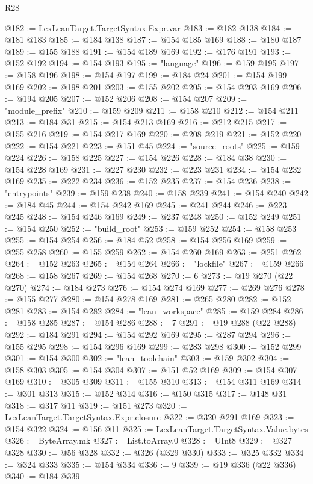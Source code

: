 \begin{lexlean}{R28}
\begin{coremodule}
@182 := LexLeanTarget.TargetSyntax.Expr.var
@183 := @182 @138
@184 := @181 @183
@185 := @184 @138
@187 := @154 @185 @169
@188 := @180 @187
@189 := @155 @188
@191 := @154 @189 @169
@192 := @176 @191
@193 := @152 @192
@194 := @154 @193
@195 := "language"
@196 := @159 @195
@197 := @158 @196
@198 := @154 @197
@199 := @184 @24
@201 := @154 @199 @169
@202 := @198 @201
@203 := @155 @202
@205 := @154 @203 @169
@206 := @194 @205
@207 := @152 @206
@208 := @154 @207
@209 := "module_prefix"
@210 := @159 @209
@211 := @158 @210
@212 := @154 @211
@213 := @184 @31
@215 := @154 @213 @169
@216 := @212 @215
@217 := @155 @216
@219 := @154 @217 @169
@220 := @208 @219
@221 := @152 @220
@222 := @154 @221
@223 := @151 @45
@224 := "source_roots"
@225 := @159 @224
@226 := @158 @225
@227 := @154 @226
@228 := @184 @38
@230 := @154 @228 @169
@231 := @227 @230
@232 := @223 @231
@234 := @154 @232 @169
@235 := @222 @234
@236 := @152 @235
@237 := @154 @236
@238 := "entrypoints"
@239 := @159 @238
@240 := @158 @239
@241 := @154 @240
@242 := @184 @45
@244 := @154 @242 @169
@245 := @241 @244
@246 := @223 @245
@248 := @154 @246 @169
@249 := @237 @248
@250 := @152 @249
@251 := @154 @250
@252 := "build_root"
@253 := @159 @252
@254 := @158 @253
@255 := @154 @254
@256 := @184 @52
@258 := @154 @256 @169
@259 := @255 @258
@260 := @155 @259
@262 := @154 @260 @169
@263 := @251 @262
@264 := @152 @263
@265 := @154 @264
@266 := "lockfile"
@267 := @159 @266
@268 := @158 @267
@269 := @154 @268
@270 := 6
@273 := @19 @270 (@22 @270)
@274 := @184 @273
@276 := @154 @274 @169
@277 := @269 @276
@278 := @155 @277
@280 := @154 @278 @169
@281 := @265 @280
@282 := @152 @281
@283 := @154 @282
@284 := "lean_workspace"
@285 := @159 @284
@286 := @158 @285
@287 := @154 @286
@288 := 7
@291 := @19 @288 (@22 @288)
@292 := @184 @291
@294 := @154 @292 @169
@295 := @287 @294
@296 := @155 @295
@298 := @154 @296 @169
@299 := @283 @298
@300 := @152 @299
@301 := @154 @300
@302 := "lean_toolchain"
@303 := @159 @302
@304 := @158 @303
@305 := @154 @304
@307 := @151 @52 @169
@309 := @154 @307 @169
@310 := @305 @309
@311 := @155 @310
@313 := @154 @311 @169
@314 := @301 @313
@315 := @152 @314
@316 := @150 @315
@317 := @148 @31
@318 := @317 @11
@319 := @151 @273
@320 := LexLeanTarget.TargetSyntax.Expr.closure
@322 := @320 @291 @169
@323 := @154 @322
@324 := @156 @11
@325 := LexLeanTarget.TargetSyntax.Value.bytes
@326 := ByteArray.mk
@327 := List.toArray.{0}
@328 := UInt8
@329 := @327 @328
@330 := @56 @328
@332 := @326 (@329 @330)
@333 := @325 @332
@334 := @324 @333
@335 := @154 @334
@336 := 9
@339 := @19 @336 (@22 @336)
@340 := @184 @339

\end{coremodule}
\end{lexlean}
